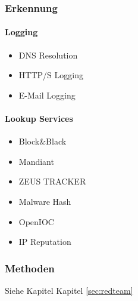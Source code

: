 \subsubsection{Erkennung}
\paragraph{Logging}
\begin{itemize}
  \item DNS Resolution
  \item HTTP/S Logging
  \item E-Mail Logging
\end{itemize}

\paragraph{Lookup Services}
\begin{itemize}
  \item Block\&Black
  \item Mandiant
  \item ZEUS TRACKER
  \item Malware Hash
  \item OpenIOC
  \item IP Reputation
\end{itemize}

\subsubsection{Methoden}
Siehe Kapitel Kapitel \ref{sec:redteam}